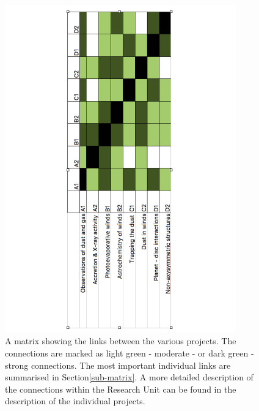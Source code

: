 \documentclass[10pt,fleqn,twoside]{article}
\begin{document}
\begin{figure}
\centerline{\includegraphics[width=10cm, angle = 270]{figures/matrix.pdf}}
\caption{\label{fig-matrix} A matrix showing the links between the various
projects. The connections are marked as light green - moderate - or
dark green - strong connections. The most important individual links
are summarised in  Section\ref{sub-matrix}.  A more detailed
description of the connections within the 
Research Unit can be found in the description of the individual
projects.  }
\end{figure}
\end{document}
